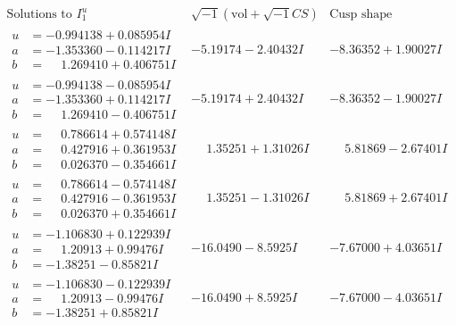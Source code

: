 \documentclass[1p]{elsarticle_modified}
\theoremstyle{definition}
\newcommand{\I}{\sqrt{-1}}
\begin{document}
$$\begin{array}{c|c|c}  
\text{Solutions to }I^u_{1}& \I (\text{vol} + \sqrt{-1}CS) & \text{Cusp shape}\\
 \hline 
\begin{aligned}
u &= -0.994138 + 0.085954 I \\
a &= -1.353360 - 0.114217 I \\
b &= \phantom{-}1.269410 + 0.406751 I\end{aligned}
 & -5.19174 - 2.40432 I & -8.36352 + 1.90027 I \\ \hline\begin{aligned}
u &= -0.994138 - 0.085954 I \\
a &= -1.353360 + 0.114217 I \\
b &= \phantom{-}1.269410 - 0.406751 I\end{aligned}
 & -5.19174 + 2.40432 I & -8.36352 - 1.90027 I \\ \hline\begin{aligned}
u &= \phantom{-}0.786614 + 0.574148 I \\
a &= \phantom{-}0.427916 + 0.361953 I \\
b &= \phantom{-}0.026370 - 0.354661 I\end{aligned}
 & \phantom{-}1.35251 + 1.31026 I & \phantom{-}5.81869 - 2.67401 I \\ \hline\begin{aligned}
u &= \phantom{-}0.786614 - 0.574148 I \\
a &= \phantom{-}0.427916 - 0.361953 I \\
b &= \phantom{-}0.026370 + 0.354661 I\end{aligned}
 & \phantom{-}1.35251 - 1.31026 I & \phantom{-}5.81869 + 2.67401 I \\ \hline\begin{aligned}
u &= -1.106830 + 0.122939 I \\
a &= \phantom{-}1.20913 + 0.99476 I \\
b &= -1.38251 - 0.85821 I\end{aligned}
 & -16.0490 - 8.5925 I & -7.67000 + 4.03651 I \\ \hline\begin{aligned}
u &= -1.106830 - 0.122939 I \\
a &= \phantom{-}1.20913 - 0.99476 I \\
b &= -1.38251 + 0.85821 I\end{aligned}
 & -16.0490 + 8.5925 I & -7.67000 - 4.03651 I \\ \hline\begin{aligned}

\end{aligned}
\end{array}$$
\end{document}
